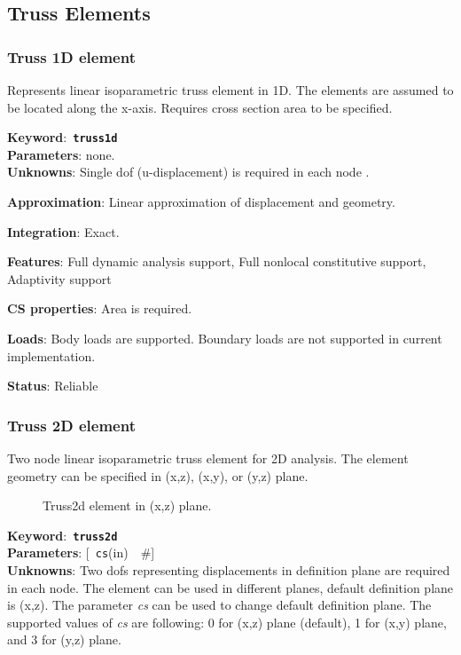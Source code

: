 \documentclass[a4paper]{article}
\newcommand{\descitem}[1]{{\noindent \bf #1}:}
\newcommand{\elemkeyword}[1]{\descitem{Keyword}~{\bf \texttt{#1}}}
\newcommand{\elemparam}[2]{{{\texttt{#1}\tiny (#2)}~~\#}}
\newcommand{\optelemparam}[2]{{[~\elemparam{#1}{#2}]}}
\newcommand{\param}[1]{{\em #1}}
\begin{document}
\subsection{Truss Elements}

\subsubsection{Truss 1D element}
\label{Truss1d}

Represents linear isoparametric truss element in 1D. The elements are
assumed to be located along the x-axis. Requires cross section area to be
specified.

\elemkeyword{truss1d}\\
\descitem{Parameters} none.\\
\descitem{Unknowns}
Single dof (u-displacement) is required in each node .

\descitem{Approximation} Linear approximation of displacement and geometry.

\descitem{Integration} Exact.

\descitem{Features} Full dynamic analysis support, Full nonlocal
constitutive support, Adaptivity support

\descitem{CS properties} Area is required.

\descitem{Loads} Body loads are supported. Boundary loads are
not supported in current implementation.

\descitem{Status} Reliable

\subsubsection{Truss 2D element}
\label{Truss2d}

Two node linear isoparametric truss element for 2D analysis. The
element geometry can be specified in (x,z), (x,y), or (y,z) plane. 
\begin{figure}[tb]
 \centering
 \begin{makeimage}
  
 \end{makeimage}
 \caption{Truss2d element in (x,z) plane.}
\end{figure}

\elemkeyword{truss2d}\\
\descitem{Parameters} \optelemparam{cs}{in}\\

\descitem{Unknowns}
Two dofs representing displacements in definition plane are required
in each node. The element can be used in different planes, default
definition plane is (x,z). The parameter \param{cs} can be used to
change default definition plane. The supported values of \param{cs} 
are following: 0 for (x,z) plane (default), 1 for (x,y)
plane, and 3 for (y,z) plane.
\end{document}
